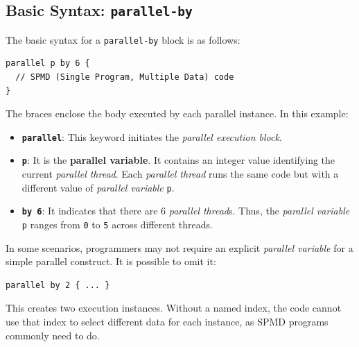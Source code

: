 \subsection*{Basic Syntax: \texttt{parallel-by}}

The basic syntax for a \texttt{parallel-by} block is as follows:

\begin{lstlisting}[language=croqtile,caption={A named parallel index}]
parallel p by 6 {
  // SPMD (Single Program, Multiple Data) code
}
\end{lstlisting}

The braces enclose the body executed by each parallel instance. In this example:

\begin{itemize}[leftmargin=1.6em]
\item \textbf{\texttt{parallel}}: This keyword initiates the \emph{parallel execution block}.
\item \textbf{\texttt{p}}: It is the \textbf{parallel variable}. It contains an integer value identifying the current \emph{parallel thread}. Each \emph{parallel thread} runs the same code but with a different value of \emph{parallel variable} \texttt{p}.
\item \textbf{\texttt{by 6}}: It indicates that there are 6 \emph{parallel thread}s. Thus, the \emph{parallel variable} \texttt{p} ranges from \texttt{0} to \texttt{5} across different threads.
\end{itemize}

In some scenarios, programmers may not require an explicit \emph{parallel variable} for a simple parallel construct. It is possible to omit it:

\begin{lstlisting}[language=croqtile,caption={An unnamed parallel index}]
parallel by 2 { ... }
\end{lstlisting}

This creates two execution instances. Without a named index, the code cannot use that index to select different data for each instance, as SPMD programs commonly need to do.
